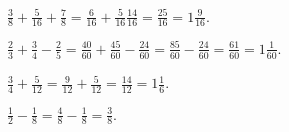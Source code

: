 \documentclass[12pt]{article}
\newenvironment{problem}[2][Problem]{\begin{trivlist}
\item[\hskip \labelsep {\bfseries #1}\hskip \labelsep {\bfseries #2.}]}{\end{trivlist}}
\begin{document}
\begin{problem}{26}
$\frac{3}{8} + \frac{5}{16} + \frac{7}{8} = \frac{6}{16} + \frac{5}{16}  \frac{14}{16} = \frac{25}{16} = \boxed{1 \frac{9}{16}}.$
\end{problem}

\begin{problem}{28}
$\frac{2}{3} + \frac{3}{4} - \frac{2}{5} = \frac{40}{60} + \frac{45}{60} - \frac{24}{60} = \frac{85}{60} - \frac{24}{60} = \frac{61}{60} = \boxed{1 \frac{1}{60}}.$
\end{problem}

\begin{problem}{53}
$\frac{3}{4} + \frac{5}{12} = \frac{9}{12} + \frac{5}{12} = \frac{14}{12} = \boxed{1 \frac{1}{6}}$.
\end{problem}

\begin{problem}{55}
$\frac{1}{2} - \frac{1}{8} = \frac{4}{8} - \frac{1}{8} = \boxed{\frac{3}{8}}.$
\end{problem}
\end{document}
